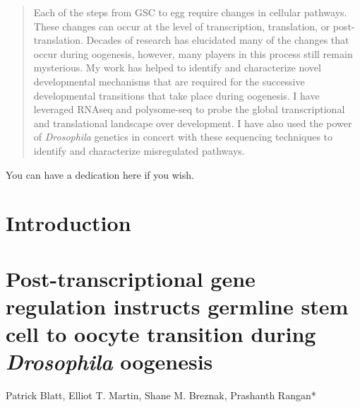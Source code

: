 \documentclass[12pt,oneside]{reedthesis}
\begin{document}
\begin{abstract}
    Each of the steps from GSC to egg require changes in cellular pathways. These changes can occur at the level of transcription, translation, or post-translation. Decades of research has elucidated many of the changes that occur during oogenesis, however, many players in this process still remain mysterious. My work has helped to identify and characterize novel developmental mechanisms that are required for the successive developmental transitions that take place during oogenesis. I have leveraged RNAseq and polysome-seq to probe the global transcriptional and translational landscape over development. I have also used the power of \emph{Drosophila} genetics in concert with these sequencing techniques to identify and characterize misregulated pathways.
  \end{abstract}
  \begin{dedication}
    You can have a dedication here if you wish.
  \end{dedication}
\mainmatter %
\pagestyle{fancyplain} %

\hypertarget{introduction}{%
\chapter*{Introduction}\label{introduction}}

















\hypertarget{post-transcriptional-gene-regulation-instructs-germline-stem-cell-to-oocyte-transition-during-drosophila-oogenesis}{%
\chapter{\texorpdfstring{Post-transcriptional gene regulation instructs germline stem cell to oocyte transition during \emph{Drosophila} oogenesis}{Post-transcriptional gene regulation instructs germline stem cell to oocyte transition during Drosophila oogenesis}}\label{post-transcriptional-gene-regulation-instructs-germline-stem-cell-to-oocyte-transition-during-drosophila-oogenesis}}

Patrick Blatt, Elliot T. Martin, Shane M. Breznak, Prashanth Rangan*
\end{document}
